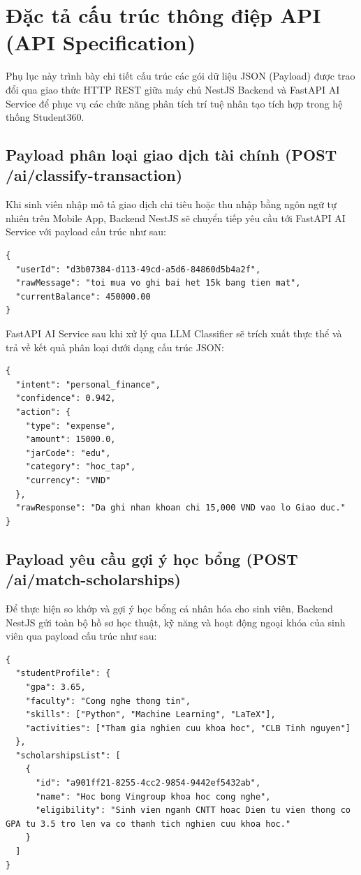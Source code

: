 \appendix

\chapter{Đặc tả cấu trúc thông điệp API (API Specification)}
\label{Appendix1}

Phụ lục này trình bày chi tiết cấu trúc các gói dữ liệu JSON (Payload) được trao đổi qua giao thức HTTP REST giữa máy chủ NestJS Backend và FastAPI AI Service để phục vụ các chức năng phân tích trí tuệ nhân tạo tích hợp trong hệ thống Student360.

\section{Payload phân loại giao dịch tài chính (POST /ai/classify-transaction)}
Khi sinh viên nhập mô tả giao dịch chi tiêu hoặc thu nhập bằng ngôn ngữ tự nhiên trên Mobile App, Backend NestJS sẽ chuyển tiếp yêu cầu tới FastAPI AI Service với payload cấu trúc như sau:

\begin{lstlisting}[caption={Payload yêu cầu phân loại giao dịch}]
{
  "userId": "d3b07384-d113-49cd-a5d6-84860d5b4a2f",
  "rawMessage": "toi mua vo ghi bai het 15k bang tien mat",
  "currentBalance": 450000.00
}
\end{lstlisting}

FastAPI AI Service sau khi xử lý qua LLM Classifier sẽ trích xuất thực thể và trả về kết quả phân loại dưới dạng cấu trúc JSON:

\begin{lstlisting}[caption={Response kết quả phân loại giao dịch từ AI}]
{
  "intent": "personal_finance",
  "confidence": 0.942,
  "action": {
    "type": "expense",
    "amount": 15000.0,
    "jarCode": "edu",
    "category": "hoc_tap",
    "currency": "VND"
  },
  "rawResponse": "Da ghi nhan khoan chi 15,000 VND vao lo Giao duc."
}
\end{lstlisting}

\section{Payload yêu cầu gợi ý học bổng (POST /ai/match-scholarships)}
Để thực hiện so khớp và gợi ý học bổng cá nhân hóa cho sinh viên, Backend NestJS gửi toàn bộ hồ sơ học thuật, kỹ năng và hoạt động ngoại khóa của sinh viên qua payload cấu trúc như sau:

\begin{lstlisting}[caption={Payload thông tin hồ sơ sinh viên để so khớp học bổng}]
{
  "studentProfile": {
    "gpa": 3.65,
    "faculty": "Cong nghe thong tin",
    "skills": ["Python", "Machine Learning", "LaTeX"],
    "activities": ["Tham gia nghien cuu khoa hoc", "CLB Tinh nguyen"]
  },
  "scholarshipsList": [
    {
      "id": "a901ff21-8255-4cc2-9854-9442ef5432ab",
      "name": "Hoc bong Vingroup khoa hoc cong nghe",
      "eligibility": "Sinh vien nganh CNTT hoac Dien tu vien thong co GPA tu 3.5 tro len va co thanh tich nghien cuu khoa hoc."
    }
  ]
}
\end{lstlisting}

